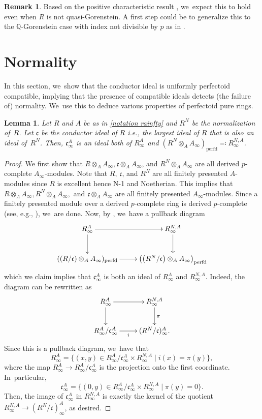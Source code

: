 \documentclass[11pt]{article}
\newcommand{\ie}{i.e.,\xspace}
\let\autoref\cref
\theoremstyle{plain}
\newtheorem{lemma}[theorem]{Lemma}
\theoremstyle{definition}
\newtheorem{remark}[theorem]{Remark}
\numberwithin{equation}{theorem}
\let\tensor\otimes
\newcommand{\Q}{\mathbb {Q}}
\newcommand{\fracc}{\mathfrak{c}}
\newcommand{\perfd}{_{\mathrm{perfd}}}
\newcommand{\rafty}{R^A_\infty}
\newcommand{\ranfty}{R^{N,A}_\infty}
\newcommand{\cafty}{\fracc^A_\infty}
\begin{document}
\begin{remark}
Based on the positive characteristic result \cite{SchwedeCentersOfFPurity}, we~expect this to hold even when $R$ is not quasi-Gorenstein. A first step could be to generalize this to the $\Q$-Gorenstein case with index not divisible by $p$ as in \cite[Cor.\,5.11]{BMPSTWWPerfectoidPure}.
\end{remark}

\section{Normality}

In this section, we~show that the conductor ideal is uniformly perfectoid compatible, implying that the presence of compatible ideals detects (the failure of) normality. We~use this to deduce various properties of perfectoid pure rings.

\begin{lemma}\label{lemma perfectoidization same ideal}
Let $R$ and $A$ be as in \autoref{notation rainfty} and $R^N$ be the normalization of~$R$. Let $\fracc$ be the conductor ideal of $R$ \ie the largest ideal of $R$ that is also an ideal of~$R^N$. Then, $\cafty$ is an ideal both of $\rafty$ and $(R^N\tensor_A A_\infty)\perfd\eqqcolon\ranfty$.
\end{lemma}

\begin{proof}
We first show that $R\tensor_A A_\infty, \fracc\tensor_A A_\infty$, and $R^N\tensor_A A_\infty$ are all derived $p$-complete $A_\infty$-modules. Note that $R$, $\fracc$, and $R^N$ are all finitely presented $A$-modules since $R$ is excellent hence N-1 and Noetherian. This implies that $R\tensor_A A_\infty, R^N\tensor_A A_\infty, $ and $\fracc\tensor_A A_\infty$ are all finitely presented $A_\infty$-modules. Since a finitely presented module over a derived $p$-complete ring is derived $p$-complete (see, e.g., \cite[Cor.\,6.3.2]{KedlayaPrismaticNotes}), we~are done.
Now, by \cite[Cor.\,8.12]{BhattScholzePrisms}, we~have a pullback diagram
\[
\xymatrix{
\rafty \ar[d] \ar[r] & \ranfty \ar[d]\\
((R/\fracc)\tensor_A A_\infty)\perfd\ar[r]& \left(\left(R^N/\fracc\right)\tensor_A A_\infty \right)\perfd
}
\]
which we claim implies that $\cafty$ is both an ideal of $\rafty$ and $R^{N,A}_\infty$. Indeed, the diagram can be rewritten as
\[
\xymatrix{
\rafty \ar[d] \ar[r] & \ranfty \ar[d]^\pi\\
\rafty/\cafty \ar[r]_-i & (R^N/\fracc)^A_\infty.
}
\]
Since this is a pullback diagram, we~have that
\[
\rafty=\bigl\{(x,y)\in \rafty/\cafty \times \ranfty \mid i(x)=\pi(y) \bigr\},
\]
where the map $\rafty\to \rafty/\cafty$ is the projection onto the first coordinate. In~particular,
\[\cafty=\bigl\{(0,y)\in \rafty/\cafty \times \ranfty \mid \pi(y)=0 \bigr\}.\] Then, the image of $\cafty$ in $\ranfty$ is exactly the kernel of the quotient $\ranfty\to (R^N/\fracc)^A_\infty$, as desired.
\end{proof}
\end{document}
